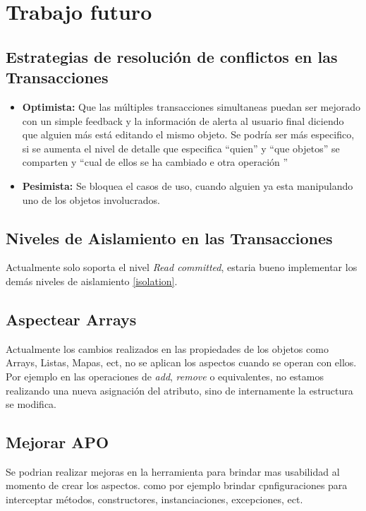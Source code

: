 
\section{Trabajo futuro}
\label{sec:futurework}


	\subsection{Estrategias de resolución de conflictos en las Transacciones}
	
		\begin{itemize}
	
			\item{\bf Optimista:} Que las múltiples  transacciones simultaneas puedan ser
			mejorado con un simple feedback y la información de alerta al
			usuario final diciendo que alguien más está editando el mismo objeto.
			Se podría ser más especifico, si se aumenta el nivel de detalle que especifica
			``quien'' y ``que objetos'' se comparten y ``cual de ellos se ha cambiado e
			otra operación ''
		
			\item{\bf Pesimista:} Se  bloquea el casos de uso, cuando alguien ya esta
			manipulando uno de los objetos involucrados. 
	
		\end{itemize}
		
	\subsection{Niveles de Aislamiento en las Transacciones}
	Actualmente solo soporta el nivel \emph{Read committed}, estaria bueno
	implementar los demás niveles de aislamiento \ref{isolation}.
	
	\subsection{Aspectear Arrays}
		Actualmente los cambios realizados en las propiedades de los objetos como
		Arrays, Listas, Mapas, ect, no se aplican los aspectos cuando se operan con
		ellos. Por ejemplo en las operaciones de \emph{add}, \emph{remove} o
		equivalentes, no estamos realizando una nueva asignación del atributo, sino de
		internamente la estructura se modifica.
		
	\subsection{Mejorar APO}
		Se podrian realizar mejoras en la herramienta para brindar mas usabilidad al
		momento de crear los aspectos. como por ejemplo brindar cpnfiguraciones para
		interceptar métodos, constructores, instanciaciones, excepciones, ect.
		 
